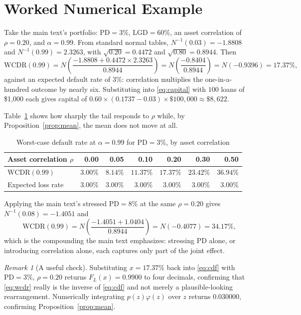 \documentclass[11pt]{article}
\theoremstyle{remark}
\newtheorem*{remark}{Remark}
\theoremstyle{definition}
\begin{document}
\section{Worked Numerical Example}
\label{sec:example}

Take the main text's portfolio: $\text{PD}=3\%$, $\text{LGD}=60\%$, an asset correlation of $\rho=0.20$, and $\alpha=0.99$. From standard normal tables, $N^{-1}(0.03) = -1.8808$ and $N^{-1}(0.99) = 2.3263$, with $\sqrt{0.20}=0.4472$ and $\sqrt{0.80}=0.8944$. Then
\begin{equation*}
\text{WCDR}(0.99) = N\!\left(\frac{-1.8808 + 0.4472 \times 2.3263}{0.8944}\right) = N\!\left(\frac{-0.8404}{0.8944}\right) = N(-0.9396) = 17.37\%,
\end{equation*}
against an expected default rate of $3\%$: correlation multiplies the one-in-a-hundred outcome by nearly six. Substituting into \eqref{eq:capital} with $100$ loans of \$1,000 each gives capital of $0.60\times(0.1737-0.03)\times\$100{,}000 \approx \$8{,}622$.

Table~\ref{tab:rho} shows how sharply the tail responds to $\rho$ while, by Proposition~\ref{prop:mean}, the mean does not move at all.

\begin{table}[htbp]
\centering
\caption{Worst-case default rate at $\alpha=0.99$ for $\text{PD}=3\%$, by asset correlation}
\label{tab:rho}
\begin{tabular}{lrrrrrr}
\toprule
Asset correlation $\rho$ & 0.00 & 0.05 & 0.10 & 0.20 & 0.30 & 0.50 \\
\midrule
$\text{WCDR}(0.99)$ & $3.00\%$ & $8.14\%$ & $11.37\%$ & $17.37\%$ & $23.42\%$ & $36.94\%$ \\
Expected loss rate & $3.00\%$ & $3.00\%$ & $3.00\%$ & $3.00\%$ & $3.00\%$ & $3.00\%$ \\
\bottomrule
\end{tabular}
\end{table}

Applying the main text's stressed $\text{PD}=8\%$ at the same $\rho=0.20$ gives $N^{-1}(0.08)=-1.4051$ and
\begin{equation*}
\text{WCDR}(0.99) = N\!\left(\frac{-1.4051 + 1.0404}{0.8944}\right) = N(-0.4077) = 34.17\%,
\end{equation*}
which is the compounding the main text emphasizes: stressing $\text{PD}$ alone, or introducing correlation alone, each captures only part of the joint effect.

\begin{remark}[A useful check]
\label{rem:check}
Substituting $x = 17.37\%$ back into \eqref{eq:cdf} with $\text{PD}=3\%$, $\rho=0.20$ returns $F_L(x) = 0.9900$ to four decimals, confirming that \eqref{eq:wcdr} really is the inverse of \eqref{eq:cdf} and not merely a plausible-looking rearrangement. Numerically integrating $p(z)\varphi(z)$ over $z$ returns $0.030000$, confirming Proposition~\ref{prop:mean}.
\end{remark}
\end{document}
